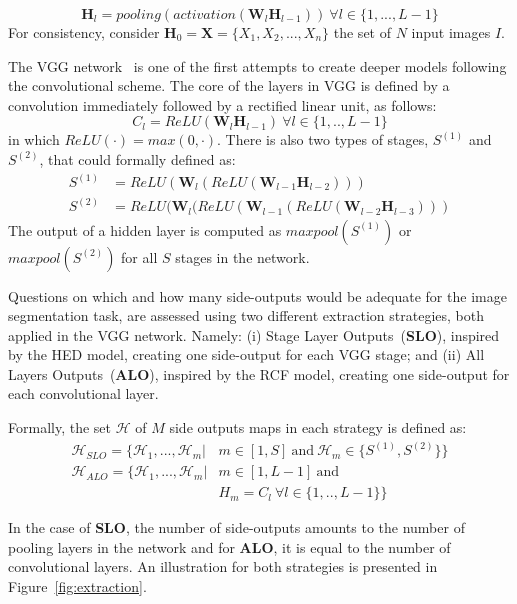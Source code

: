 \small
\begin{equation}
\mathbf{H}_l= pooling(activation(\mathbf{W}_l\mathbf{H}_{l-1}))~\forall l \in \{1,...,L-1\}
\end{equation}
\normalsize
\noindent For consistency, consider $\mathbf{H}_0=\mathbf{X}=\{X_1, X_2,...,X_n\}$ the set of $N$ input images $I$.

The VGG network~\cite{simonyan2014} is one of the first attempts to create deeper models following the convolutional scheme. The core of the layers in VGG is defined by a convolution immediately followed by a rectified linear unit, as follows:
\begin{equation}
C_l=ReLU(\mathbf{W}_{l}\mathbf{H}_{l-1})~\forall l \in \{1,..,L-1\}
\end{equation}
\noindent in which $ReLU(\cdot)=max(0,\cdot)$. There is also two types of stages, $\mathit{S}^{(1)}$ and $\mathit{S}^{(2)}$, that could formally defined as:
\small
\begin{align}
\mathit{S}^{(1)}&=ReLU(\mathbf{W}_l(ReLU(\mathbf{W}_{l-1}\mathbf{H}_{l-2})))\\
\mathit{S}^{(2)}&=ReLU(\mathbf{W}_l(ReLU(\mathbf{W}_{l-1}(ReLU(\mathbf{W}_{l-2}\mathbf{H}_{l-3})))
\end{align}
\normalsize
\noindent The output of a hidden layer is computed as $maxpool(\mathit{S}^{(1)})$ or $maxpool(\mathit{S}^{(2)})$ for all $S$ stages in the network.

Questions on which and how many side-outputs would be adequate for the image segmentation task, are assessed using two different extraction strategies, both applied in the VGG network. Namely: (i) Stage Layer Outputs~(\textbf{SLO}), inspired by the HED model, creating one side-output for each VGG stage; and (ii) All Layers Outputs~(\textbf{ALO}), inspired by the RCF model, creating one side-output for each convolutional layer. 

Formally, the set $\mathcal{H}$ of $M$ side outputs maps in each strategy is defined as:
\small
\begin{align}
\mathcal{H}_{SLO}=\{\mathcal{H}_1,...,\mathcal{H}_m|& m\in[1,S]~\text{and}~\mathcal{H}_m \in\{S^{(1)},S^{(2)}\}\}\\
\mathcal{H}_{ALO}=\{\mathcal{H}_1,...,\mathcal{H}_m|& m\in[1,L-1]~\text{and}~\nonumber\\&{H}_m=C_l~\forall l \in \{1,..,L-1\}\}
\end{align}
\normalsize

In the case of \textbf{SLO}, the number of side-outputs amounts to the number of pooling layers in the network and for \textbf{ALO}, it is equal to the number of convolutional layers. An illustration for both strategies is presented in Figure~\ref{fig:extraction}.


